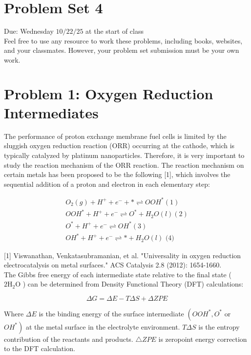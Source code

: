 \documentclass[12pt]{article}
\begin{document}
\section*{Problem Set 4}
Due: Wednesday $10 / 22 / 25$ at the start of class\\
Feel free to use any resource to work these problems, including books, websites, and your classmates. However, your problem set submission must be your own work.

\section*{Problem 1: Oxygen Reduction Intermediates}
The performance of proton exchange membrane fuel cells is limited by the sluggish oxygen reduction reaction (ORR) occurring at the cathode, which is typically catalyzed by platinum nanoparticles. Therefore, it is very important to study the reaction mechanism of the ORR reaction. The reaction mechanism on certain metals has been proposed to be the following [1], which involves the sequential addition of a proton and electron in each elementary step:


\begin{gather*}
O_{2}(g)+H^{+}+e^{-}+* \rightleftharpoons O O H^{*}(1)  \tag{1}\\
O O H^{*}+H^{+}+e^{-} \rightleftharpoons O^{*}+H_{2} O(l)(2) \\
O^{*}+H^{+}+e^{-} \rightleftharpoons O H^{*}(3) \\
O H^{*}+H^{+}+e^{-} \rightleftharpoons *+H_{2} O(l) \text { (4) } \tag{4}
\end{gather*}


[1] Viswanathan, Venkatasubramanian, et al. "Universality in oxygen reduction electrocatalysis on metal surfaces." ACS Catalysis 2.8 (2012): 1654-1660.\\
The Gibbs free energy of each intermediate state relative to the final state ( $2 \mathrm{H}_{2} \mathrm{O}$ ) can be determined from Density Functional Theory (DFT) calculations:

$$
\Delta G=\Delta E-T \Delta S+\Delta Z P E
$$

Where $\Delta E$ is the binding energy of the surface intermediate $\left(O O H^{*}, O^{*}\right.$ or $\left.O H^{*}\right)$ at the metal surface in the electrolyte environment. $T \Delta S$ is the entropy contribution of the reactants and products. $\triangle Z P E$ is zeropoint energy correction to the DFT calculation.
\end{document}
